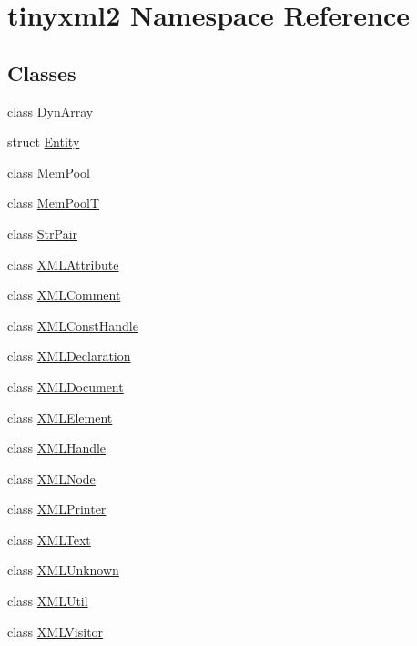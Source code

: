 \hypertarget{namespacetinyxml2}{}\section{tinyxml2 Namespace Reference}
\label{namespacetinyxml2}
\subsection*{Classes}
\begin{DoxyCompactItemize}
\item 
class \hyperlink{classtinyxml2_1_1_dyn_array}{Dyn\+Array}
\item 
struct \hyperlink{structtinyxml2_1_1_entity}{Entity}
\item 
class \hyperlink{classtinyxml2_1_1_mem_pool}{Mem\+Pool}
\item 
class \hyperlink{classtinyxml2_1_1_mem_pool_t}{Mem\+Pool\+T}
\item 
class \hyperlink{classtinyxml2_1_1_str_pair}{Str\+Pair}
\item 
class \hyperlink{classtinyxml2_1_1_x_m_l_attribute}{X\+M\+L\+Attribute}
\item 
class \hyperlink{classtinyxml2_1_1_x_m_l_comment}{X\+M\+L\+Comment}
\item 
class \hyperlink{classtinyxml2_1_1_x_m_l_const_handle}{X\+M\+L\+Const\+Handle}
\item 
class \hyperlink{classtinyxml2_1_1_x_m_l_declaration}{X\+M\+L\+Declaration}
\item 
class \hyperlink{classtinyxml2_1_1_x_m_l_document}{X\+M\+L\+Document}
\item 
class \hyperlink{classtinyxml2_1_1_x_m_l_element}{X\+M\+L\+Element}
\item 
class \hyperlink{classtinyxml2_1_1_x_m_l_handle}{X\+M\+L\+Handle}
\item 
class \hyperlink{classtinyxml2_1_1_x_m_l_node}{X\+M\+L\+Node}
\item 
class \hyperlink{classtinyxml2_1_1_x_m_l_printer}{X\+M\+L\+Printer}
\item 
class \hyperlink{classtinyxml2_1_1_x_m_l_text}{X\+M\+L\+Text}
\item 
class \hyperlink{classtinyxml2_1_1_x_m_l_unknown}{X\+M\+L\+Unknown}
\item 
class \hyperlink{classtinyxml2_1_1_x_m_l_util}{X\+M\+L\+Util}
\item 
class \hyperlink{classtinyxml2_1_1_x_m_l_visitor}{X\+M\+L\+Visitor}
\end{DoxyCompactItemize}
